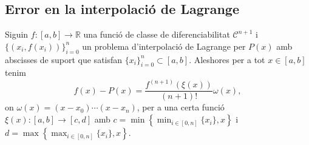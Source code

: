 \documentclass[../Apunts.tex]{subfiles}
\begin{document}
	\subsection{Error en la interpolació de Lagrange}
	\begin{theorem}\label{thm:primera fita de l'error en la interpolació de Lagrange}
		Siguin \(f\colon[a,b]\longrightarrow\mathbb{R}\) una funció de classe de diferenciabilitat \(\mathcal{C}^{n+1}\) i \(\{(x_{i},f(x_{i}))\}_{i=0}^{n}\) un problema d'interpolació de Lagrange per \(P(x)\) amb abscisses de suport que satisfan \(\{x_{i}\}_{i=0}^{n}\subset[a,b]\). Aleshores per a tot \(x\in[a,b]\) tenim
		\[f(x)-P(x)=\frac{f^{(n+1)}(\xi(x))}{(n+1)!}\omega(x),\]
		on \(\omega(x)=(x-x_{0})\cdots(x-x_{n})\), per a una certa funció \(\xi(x)\colon[a,b]\longrightarrow[c,d]\) amb \(c=\min\left\{\min_{i\in[0,n]}\{x_{i}\},x\right\}\) i \(d=\max\left\{\max_{i\in[0,n]}\{x_{i}\},x\right\}\).
	\end{theorem}
\end{document}
